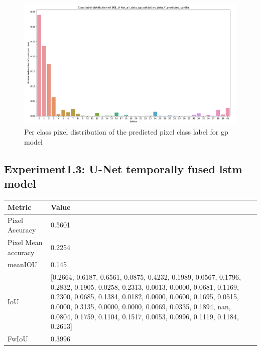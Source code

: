 	\begin{figure}
		\centering
		\includegraphics[width=16cm]{images/Y_predicted_gp.png}
		\caption{Per class pixel distribution of the predicted pixel class label for gp model}
		\label{fig:y_predi_gp}
	\end{figure}

    \subsection{Experiment1.3: U-Net temporally fused lstm model}
    
    \begin{center}
    	\begin{tabular}{ | l | p{12cm} |}
    		\hline
    		
    		\cellcolor{purple!30}Metric & \cellcolor{purple!30}Value \\ \hline
    		Pixel Accuracy & 0.5601 \\ \hline
    		Pixel Mean accuracy & 0.2254  \\ \hline
    		meanIOU & 0.145 \\ \hline
    		IoU & [0.2664, 0.6187, 0.6561, 0.0875, 0.4232, 0.1989, 0.0567, 0.1796, 0.2832,
    		0.1905, 0.0258, 0.2313, 0.0013, 0.0000, 0.0681, 0.1169, 0.2300, 0.0685,
    		0.1384, 0.0182, 0.0000, 0.0600, 0.1695, 0.0515, 0.0000, 0.3135, 0.0000,
    		0.0000, 0.0069, 0.0335, 0.1894,    nan, 0.0804, 0.1759, 0.1104, 0.1517,
    		0.0053, 0.0996, 0.1119, 0.1184, 0.2613] \\ \hline
    		FwIoU & 0.3996 \\ \hline
    		\hline
    	\end{tabular}
    \end{center}
	
